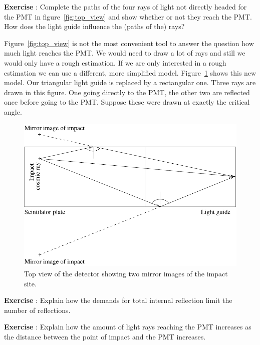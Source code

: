\documentclass[12pt,a4paper]{article}
\numberwithin{equation}{section}
\numberwithin{figure}{section}
\newcounter{Exercise}
\numberwithin{table}{section}
\begin{document}
\begin{shaded}
\textbf{Exercise \theExercise {}} : Complete the paths of the four rays of light not directly headed for the PMT in figure~\ref{fig:top_view} and show whether or not they reach the PMT. How does the light guide influence the (paths of the) rays? \end{shaded}

Figure~\ref{fig:top_view} is not the most convenient tool to answer the question how much light reaches the PMT. We would need to draw a lot of rays and still we would only have a rough estimation. If we are only interested in a rough estimation we can use a different, more simplified model. Figure~\ref{fig:top_view_simp} shows this new model. Our triangular light guide is replaced by a rectangular one. Three rays are drawn in this figure. One going directly to the PMT, the other two are reflected once before going to the PMT. Suppose these were drawn at exactly the critical angle.

\begin{figure}\begin{center}
\includegraphics[scale=1]{top_view_simp.pdf}
\caption{Top view of the detector showing two mirror images of the impact site.}\label{fig:top_view_simp}
\end{center}\end{figure}

\begin{shaded}
\textbf{Exercise \theExercise {}} : Explain how the demands for total internal reflection limit the number of reflections.\end{shaded}
\begin{shaded}
\textbf{Exercise \theExercise {}} : Explain how the amount of light rays reaching the PMT increases as the distance between the point of impact and the PMT increases.\end{shaded}
\end{document}
